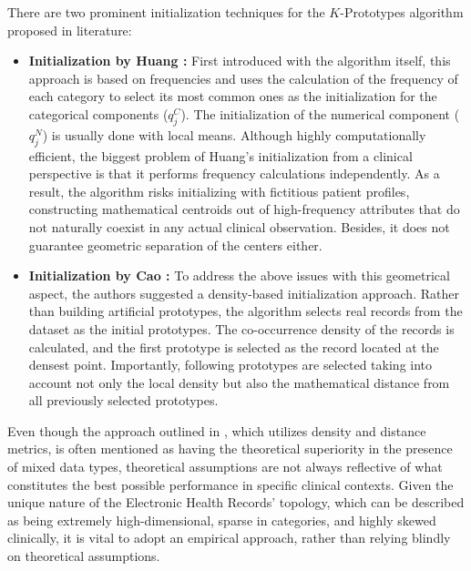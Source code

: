 \vspace{1em}

There are two prominent initialization techniques for the $K$-Prototypes algorithm proposed in literature:

\begin{itemize}
    \item \textbf{Initialization by Huang \cite{huang1998}:} First introduced with the algorithm itself, this approach is based on frequencies and uses the calculation of the frequency of each category to select its most common ones as the initialization for the categorical components ($q_j^C$). The initialization of the numerical component ($q_j^N$) is usually done with local means. Although highly computationally efficient, the biggest problem of Huang's initialization from a clinical perspective is that it performs frequency calculations independently. As a result, the algorithm risks initializing with fictitious patient profiles, constructing mathematical centroids out of high-frequency attributes that do not naturally coexist in any actual clinical observation. Besides, it does not guarantee geometric separation of the centers either.

    \item \textbf{Initialization by Cao \cite{cao2009}:} To address the above issues with this geometrical aspect, the authors suggested a density-based initialization approach. Rather than building artificial prototypes, the algorithm selects real records from the dataset as the initial prototypes. The co-occurrence density of the records is calculated, and the first prototype is selected as the record located at the densest point. Importantly, following prototypes are selected taking into account not only the local density but also the mathematical distance from all previously selected prototypes.
\end{itemize}

\vspace{1em}

Even though the approach outlined in \cite{cao2009}, which utilizes density and distance metrics, is often mentioned as having the theoretical superiority in the presence of mixed data types, theoretical assumptions are not always reflective of what constitutes the best possible performance in specific clinical contexts. Given the unique nature of the Electronic Health Records' topology, which can be described as being extremely high-dimensional, sparse in categories, and highly skewed clinically, it is vital to adopt an empirical approach, rather than relying blindly on theoretical assumptions.

